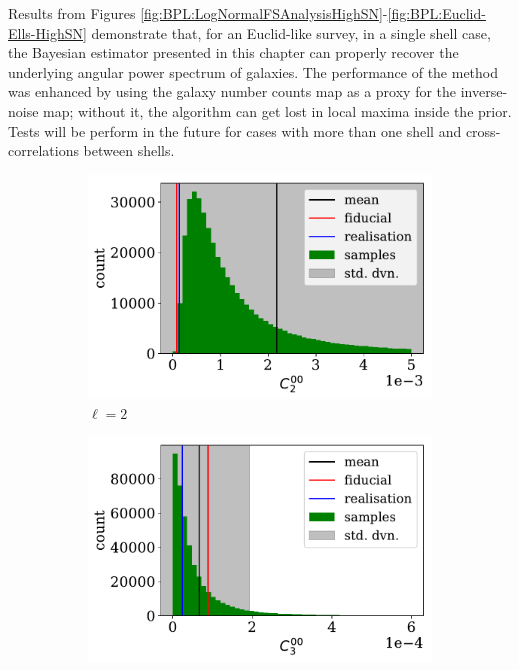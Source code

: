 \qquad Results from Figures \ref{fig:BPL:LogNormalFSAnalysisHighSN}-\ref{fig:BPL:Euclid-Ells-HighSN} demonstrate that, for an Euclid-like survey, in a single shell case, the Bayesian estimator presented in this chapter can properly recover the underlying angular power spectrum of galaxies. The performance of the method was enhanced by using the galaxy number counts map as a proxy for the inverse-noise map; without it, the algorithm can get lost in local maxima inside the prior. Tests will be perform in the future for cases with more than one shell and cross-correlations between shells.

\begin{figure}
\begin{subfigure}{.5\textwidth}
  \centering
  \includegraphics[width=\textwidth]{BPL-FIGS/Euclid-LN-PNoi-N32-HDens_HISTOGRAM-ell-02.pdf}
  \caption{$\ell = 2$}
\end{subfigure}
\begin{subfigure}{.5\textwidth}
  \centering
  \includegraphics[width=\textwidth]{BPL-FIGS/Euclid-LN-PNoi-N32-HDens_HISTOGRAM-ell-03.pdf}

\end{subfigure}
\end{figure}
